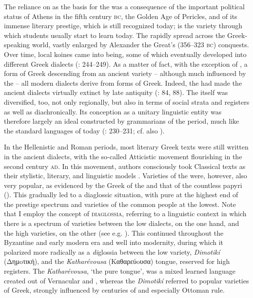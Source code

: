 The reliance on  as the basis for the  was a consequence of the important political status of Athens in the fifth century \textsc{bc}, the Golden Age of Pericles, and of its immense literary prestige, which is still recognized today;  is the variety through which students usually start to learn  today. The  rapidly spread across the Greek-speaking world, vastly enlarged by Alexander the Great’s (356–323 \textsc{bc}) conquests. Over time, local koines came into being, some of which eventually developed into different  Greek dialects (\citealt{Brixhe2010}: 244–249). As a matter of fact, with the exception of , a form of Greek descending from an ancient   variety – although much influenced by the  \citep[88]{Horrocks2010} – all modern dialects derive from forms of  Greek. Indeed, the  had made the ancient dialects virtually extinct by late antiquity (\citealt{Horrocks2010}: 84, 88). The  itself was diversified, too, not only regionally, but also in terms of social strata and registers as well as diachronically. Its conception as a unitary linguistic entity was therefore largely an ideal constructed by grammarians of the period, much like the standard languages of today (\citealt{Brixhe2010}: 230–231; cf. also \citealt{VanRooy2016b}).

In the Hellenistic and Roman periods, most literary Greek texts were still written in the ancient dialects, with the so-called Atticistic movement flourishing in the second century \textsc{ad}. In this movement, authors consciously took Classical  texts as their stylistic, literary, and linguistic models \citep[42]{Whitmarsh2005}. Varieties of the  were, however, also very popular, as evidenced by the Greek of the  and that of the countless  papyri (\citealt{Evans2010}). This gradually led to a diaglossic situation, with pure  at the highest end of the prestige spectrum and  varieties of the common people at the lowest. Note that I employ the concept of \textsc{diaglossia}, referring to a linguistic context in which there is a spectrum of varieties between the low  dialects, on the one hand, and the high varieties, on the other (see e.g. \citealt{Auer2005,Rutten2016}). This  continued throughout the Byzantine and early modern era and well into modernity, during which it polarized more radically as a \textit{di}glossia between the low  variety, \textit{Dimotikí} (Δημoτική), and the \textit{Katharévousa} (Kαθαρεύoυσα) tongue, reserved for high registers. The \textit{Katharévousa}, ‘the pure tongue’, was a mixed learned language created out of Vernacular and , whereas the \textit{Dimotikí} referred to popular varieties of Greek, strongly influenced by centuries of  and especially Ottoman rule.

